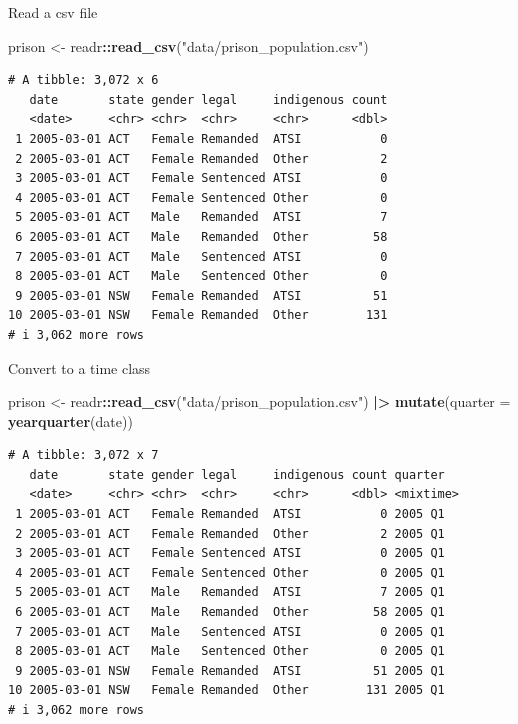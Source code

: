 \documentclass[
  14pt,
  ignorenonframetext,
  aspectratio=169,
]{beamer}
\newenvironment{Shaded}{\begin{snugshade}}{\end{snugshade}}
\newcommand{\AttributeTok}[1]{\textcolor[rgb]{0.13,0.29,0.53}{#1}}
\newcommand{\FunctionTok}[1]{\textcolor[rgb]{0.13,0.29,0.53}{\textbf{#1}}}
\newcommand{\NormalTok}[1]{#1}
\newcommand{\OtherTok}[1]{\textcolor[rgb]{0.56,0.35,0.01}{#1}}
\newcommand{\SpecialCharTok}[1]{\textcolor[rgb]{0.81,0.36,0.00}{\textbf{#1}}}
\newcommand{\StringTok}[1]{\textcolor[rgb]{0.31,0.60,0.02}{#1}}
\renewenvironment{Shaded}{\vspace*{0.15cm}\color{black}\fontsize{10}{10}\sf\begin{snugshade}\color{black}}{\end{snugshade}}
\begin{document}
\begin{frame}[fragile]{Read a csv file}
\protect{}\label{read-a-csv-file}
\fontsize{10}{11}\sf

\begin{Shaded}
\begin{Highlighting}[]
\NormalTok{prison }\OtherTok{\textless{}{-}}\NormalTok{ readr}\SpecialCharTok{::}\FunctionTok{read\_csv}\NormalTok{(}\StringTok{"data/prison\_population.csv"}\NormalTok{)}
\end{Highlighting}
\end{Shaded}

\begin{verbatim}
# A tibble: 3,072 x 6
   date       state gender legal     indigenous count
   <date>     <chr> <chr>  <chr>     <chr>      <dbl>
 1 2005-03-01 ACT   Female Remanded  ATSI           0
 2 2005-03-01 ACT   Female Remanded  Other          2
 3 2005-03-01 ACT   Female Sentenced ATSI           0
 4 2005-03-01 ACT   Female Sentenced Other          0
 5 2005-03-01 ACT   Male   Remanded  ATSI           7
 6 2005-03-01 ACT   Male   Remanded  Other         58
 7 2005-03-01 ACT   Male   Sentenced ATSI           0
 8 2005-03-01 ACT   Male   Sentenced Other          0
 9 2005-03-01 NSW   Female Remanded  ATSI          51
10 2005-03-01 NSW   Female Remanded  Other        131
# i 3,062 more rows
\end{verbatim}
\end{frame}

\begin{frame}[fragile]{Convert to a time class}
\protect{}\label{convert-to-a-time-class}
\fontsize{10}{11}\sf

\begin{Shaded}
\begin{Highlighting}[]
\NormalTok{prison }\OtherTok{\textless{}{-}}\NormalTok{ readr}\SpecialCharTok{::}\FunctionTok{read\_csv}\NormalTok{(}\StringTok{"data/prison\_population.csv"}\NormalTok{) }\SpecialCharTok{|\textgreater{}}
  \FunctionTok{mutate}\NormalTok{(}\AttributeTok{quarter =} \FunctionTok{yearquarter}\NormalTok{(date))}
\end{Highlighting}
\end{Shaded}

\begin{verbatim}
# A tibble: 3,072 x 7
   date       state gender legal     indigenous count quarter  
   <date>     <chr> <chr>  <chr>     <chr>      <dbl> <mixtime>
 1 2005-03-01 ACT   Female Remanded  ATSI           0 2005 Q1  
 2 2005-03-01 ACT   Female Remanded  Other          2 2005 Q1  
 3 2005-03-01 ACT   Female Sentenced ATSI           0 2005 Q1  
 4 2005-03-01 ACT   Female Sentenced Other          0 2005 Q1  
 5 2005-03-01 ACT   Male   Remanded  ATSI           7 2005 Q1  
 6 2005-03-01 ACT   Male   Remanded  Other         58 2005 Q1  
 7 2005-03-01 ACT   Male   Sentenced ATSI           0 2005 Q1  
 8 2005-03-01 ACT   Male   Sentenced Other          0 2005 Q1  
 9 2005-03-01 NSW   Female Remanded  ATSI          51 2005 Q1  
10 2005-03-01 NSW   Female Remanded  Other        131 2005 Q1  
# i 3,062 more rows
\end{verbatim}
\end{frame}
\end{document}
